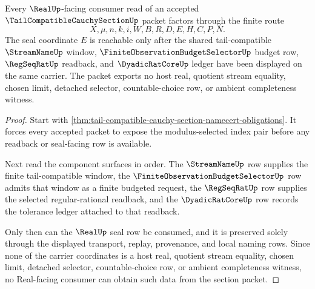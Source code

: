 \begin{theorem}
\label{thm:tail-compatible-cauchy-section-real-seal-boundary}
Every $\RealUp$-facing consumer read of an accepted $\TailCompatibleCauchySectionUp$ packet factors through the finite route
$$
X,\mu,n,k,i,W,B,R,D,E,H,C,P,N.
$$
The seal coordinate $E$ is reachable only after the shared tail-compatible $\StreamNameUp$ window, $\FiniteObservationBudgetSelectorUp$ budget row, $\RegSeqRatUp$ readback, and $\DyadicRatCoreUp$ ledger have been displayed on the same carrier. The packet exports no host real, quotient stream equality, chosen limit, detached selector, countable-choice row, or ambient completeness witness.
\end{theorem}
\begin{proof}
Start with \autoref{thm:tail-compatible-cauchy-section-namecert-obligations}. It forces every accepted packet to expose the modulus-selected index pair before any readback or seal-facing row is available.

Next read the component surfaces in order. The $\StreamNameUp$ row supplies the finite tail-compatible window, the $\FiniteObservationBudgetSelectorUp$ row admits that window as a finite budgeted request, the $\RegSeqRatUp$ row supplies the selected regular-rational readback, and the $\DyadicRatCoreUp$ row records the tolerance ledger attached to that readback.

Only then can the $\RealUp$ seal row be consumed, and it is preserved solely through the displayed transport, replay, provenance, and local naming rows. Since none of the carrier coordinates is a host real, quotient stream equality, chosen limit, detached selector, countable-choice row, or ambient completeness witness, no Real-facing consumer can obtain such data from the section packet.
\end{proof}

